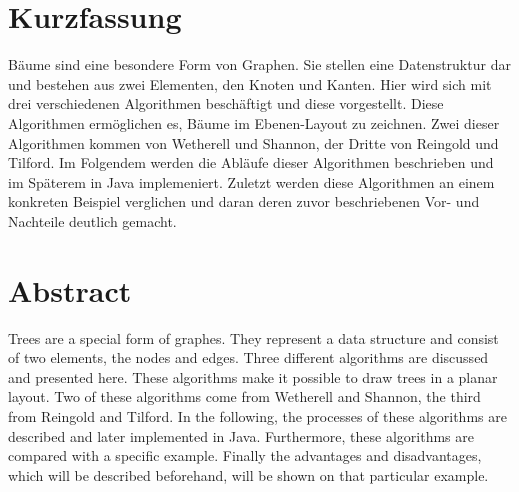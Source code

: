 \section*{Kurzfassung}
Bäume sind eine besondere Form von Graphen. Sie stellen eine Datenstruktur dar und bestehen aus zwei Elementen, 
den Knoten und Kanten. Hier wird sich mit drei verschiedenen Algorithmen beschäftigt und diese vorgestellt. Diese Algorithmen ermöglichen es, 
Bäume im Ebenen-Layout zu zeichnen. Zwei dieser Algorithmen kommen von Wetherell und Shannon, der Dritte von Reingold und Tilford.
Im Folgendem werden die Abläufe dieser Algorithmen beschrieben und im Späterem in Java implemeniert. Zuletzt werden diese Algorithmen 
an einem konkreten Beispiel verglichen und daran deren zuvor beschriebenen Vor- und Nachteile deutlich gemacht.

\vfill\vfill\vfill\vfill\vfill\vfill
\section*{Abstract}
Trees are a special form of graphes. They represent a data structure and consist of two elements,
the nodes and edges. Three different algorithms are discussed and presented here. These algorithms make it possible to
draw trees in a planar layout. Two of these algorithms come from Wetherell and Shannon, the third from Reingold and Tilford.
In the following, the processes of these algorithms are described and later implemented in Java. Furthermore, these algorithms are
compared with a specific example. Finally the advantages and disadvantages, which will be described beforehand, will be shown on that 
particular example.
\vfill\vfill\vfill\vfill\vfill\vfill